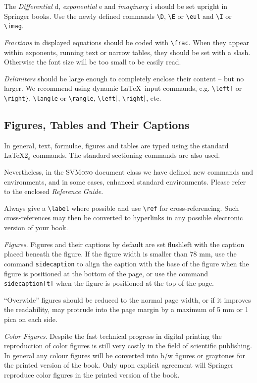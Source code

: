 \documentclass[graybox]{svmono}
\begin{document}
The {\it Differential} d, {\it exponential} e and {\it imaginary} i should be set upright in Springer books. Use the newly defined commands \verb|\D|, \verb|\E| or \verb|\eul| and \verb|\I| or \verb|\imag|.

{\it Fractions} in displayed equations should be coded with \verb|\frac|. When they appear within exponents, running text or narrow tables, they should be set with a slash. Otherwise the font size will be too small to be easily read.

{\it Delimiters} should be large enough to completely enclose their content -- but no larger. We recommend using dynamic \LaTeX~input commands, e.g. \verb|\left[| or \verb|\right}|, \verb|\langle| or \verb|\rangle|, \verb|\left|${\tt \vert}$, \verb|\right|${\tt \vert}$, etc.


\subsection{Figures, Tables and Their Captions}

In general, text, formulae, figures and tables are typed using the standard \LaTeX2$_\varepsilon$ commands. The standard sectioning commands are also used.

Nevertheless, in the \textsc{SVMono} document class we have defined new commands and environments, and in some cases, enhanced standard environments. Please refer to the enclosed \emph{Reference Guide}.

Always give a \verb|\label| where possible and use \verb|\ref| for cross-referencing. Such cross-references may then be converted to hyperlinks in any possible electronic version of your book.

\textit{Figures}. Figures and their captions by default are set flushleft with the caption placed beneath the figure. If the figure width is smaller than 78 mm, use the command \texttt{sidecaption} to align the caption with the base of the figure when the figure is positioned at the bottom of the page, or use the command \texttt{sidecaption[t]} when the figure is positioned at the top of the page.

``Overwide'' figures should be reduced to the normal page width, or if it improves the readability, may protrude into the page margin by a maximum of 5 mm or 1 pica on each side.

\emph{Color Figures}. Despite the fast technical progress in digital printing the reproduction of color figures is still very costly in the field of scientific publishing. In general any colour figures will be converted into b/w figures or graytones for the printed version of the book. Only upon explicit agreement will Springer reproduce color figures in the printed version of the book.
\end{document}

